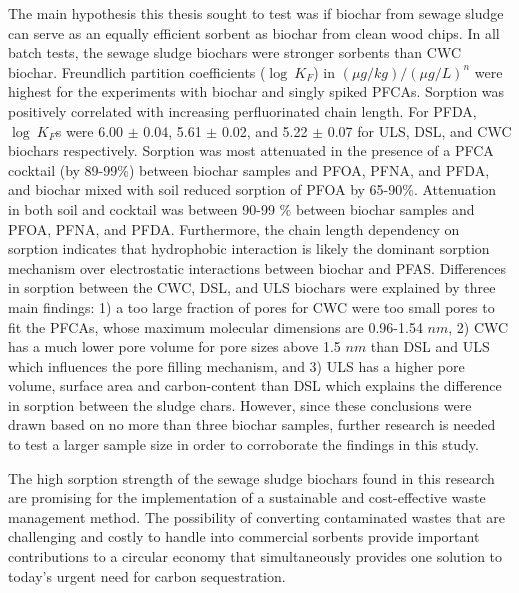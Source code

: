 The main hypothesis this thesis sought to test was if biochar from sewage sludge can serve as an equally efficient sorbent as biochar from clean wood chips. In all batch tests, the sewage sludge biochars were stronger sorbents than CWC biochar. Freundlich partition coefficients ($\log~K_F$) in $(\mu g/kg)/(\mu g/L)^n$ were highest for the experiments with biochar and singly spiked PFCAs. Sorption was positively correlated with increasing perfluorinated chain length. For PFDA, $\log~K_F$s were 6.00 $\pm$ 0.04, 5.61 $\pm$ 0.02, and 5.22 $\pm$ 0.07 for ULS, DSL, and CWC biochars respectively. Sorption was most attenuated in the presence of a PFCA cocktail (by 89-99\%) between biochar samples and PFOA, PFNA, and PFDA, and biochar mixed with soil reduced sorption of PFOA by 65-90\%. Attenuation in both soil and cocktail was between 90-99 \% between biochar samples and PFOA, PFNA, and PFDA. Furthermore, the chain length dependency on sorption indicates that hydrophobic interaction is likely the dominant sorption mechanism over electrostatic interactions between biochar and PFAS. Differences in sorption between the CWC, DSL, and ULS biochars were explained by three main findings: 1) a too large fraction of pores for CWC were too small pores to fit the PFCAs, whose maximum molecular dimensions are 0.96-1.54 $nm$, 2) CWC has a much lower pore volume for pore sizes above 1.5 $nm$ than DSL and ULS which influences the pore filling mechanism, and 3) ULS has a higher pore volume, surface area and carbon-content than DSL which explains the difference in sorption between the sludge chars. However, since these conclusions were drawn based on no more than three biochar samples, further research is needed to test a larger sample size in order to corroborate the findings in this study.

The high sorption strength of the sewage sludge biochars found in this research are promising for the implementation of a sustainable and cost-effective waste management method. The possibility of converting contaminated wastes that are challenging and costly to handle into commercial sorbents provide important contributions to a circular economy that simultaneously provides one solution to today's urgent need for carbon sequestration.